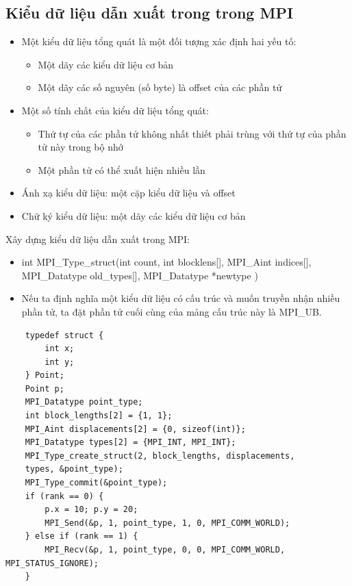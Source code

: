 \documentclass[14pt, a4paper]{article}
\numberwithin{equation}{section}
\numberwithin{figure}{section}
\numberwithin{dl}{section}
\numberwithin{md}{section}
\numberwithin{bd}{section}
\numberwithin{dn}{section}
\numberwithin{hq}{section}
\begin{document}
\subsection{Kiểu dữ liệu dẫn xuất trong trong MPI}

\begin{itemize}
    \item Một kiểu dữ liệu tổng quát là một đối tượng xác định hai yếu tố:
    \begin{itemize}
        \item Một dãy các kiểu dữ liệu cơ bản 
        \item Một dãy các số nguyên (số byte) là offset của các phần tử
    \end{itemize}
    \item Một số tính chất của kiểu dữ liệu tổng quát:
    \begin{itemize}
        \item Thứ tự của các phần tử không nhất thiết phải trùng với thứ tự của phần tử này trong bộ nhớ
        \item Một phần tử có thể xuất hiện nhiều lần
    \end{itemize}
    \item Ánh xạ kiểu dữ liệu: một cặp kiểu dữ liệu và offset
    \item Chữ ký kiểu dữ liệu: một dãy các kiểu dữ liệu cơ bản
\end{itemize}

Xây dựng kiểu dữ liệu dẫn xuất trong MPI:


\begin{itemize}
    \item int MPI\_Type\_struct(int count, int blocklens[],
                                MPI\_Aint indices[], MPI\_Datatype old\_types[],
                                MPI\_Datatype *newtype )
    \item Nếu ta định nghĩa một kiểu dữ liệu có cấu trúc và muốn truyền nhận nhiều phần tử, ta đặt phần tử cuối cùng của mảng cấu trúc này là MPI\_UB.
\end{itemize}

\begin{verbatim}
    typedef struct {
        int x;
        int y;
    } Point;
    Point p;
    MPI_Datatype point_type;
    int block_lengths[2] = {1, 1};
    MPI_Aint displacements[2] = {0, sizeof(int)};
    MPI_Datatype types[2] = {MPI_INT, MPI_INT};
    MPI_Type_create_struct(2, block_lengths, displacements, 
    types, &point_type);
    MPI_Type_commit(&point_type);
    if (rank == 0) {
        p.x = 10; p.y = 20;
        MPI_Send(&p, 1, point_type, 1, 0, MPI_COMM_WORLD);
    } else if (rank == 1) {
        MPI_Recv(&p, 1, point_type, 0, 0, MPI_COMM_WORLD, MPI_STATUS_IGNORE);
    }
        \end{verbatim}
\end{document}
